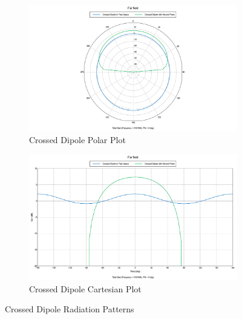 \documentclass[11pt]{witseiepaper}
\begin{document}
\begin{figure}[htb]
    \centering
    \begin{subfigure}{.5\textwidth}
        \centering
            \includegraphics[width=0.9\linewidth]{Crossed-Dipole-Polar-Plot.pdf}
            \caption{Crossed Dipole Polar Plot}
            \label{fig:Crossed-Dipole-Radiation-Patterns-Polar}
        \end{subfigure}%
        \begin{subfigure}{.5\textwidth}
            \centering
            \includegraphics[width=0.9\linewidth]{Crossed-Dipole-Cartesian-Plot.pdf}
            \caption{Crossed Dipole Cartesian Plot}
                \label{fig:Crossed-Dipole-Radiation-Patterns-Cartesian}
            \end{subfigure}
\caption{Crossed Dipole Radiation Patterns}
\label{fig:Crossed-Dipole-Radiation-Patterns}
\end{figure}
\end{document}
